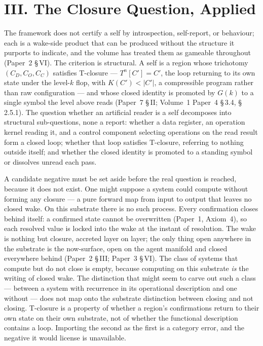 \documentclass[11pt,oneside]{report}
\theoremstyle{definition}
\theoremstyle{remark}
\begin{document}
\section*{III. The Closure Question, Applied}

The framework does not certify a self by introspection, self-report, or behaviour; each is a wake-side product that can be produced without the structure it purports to indicate, and the volume has treated them as gameable throughout (Paper~2 \S\,VI). The criterion is structural. A self is a region whose trichotomy \ensuremath{(C_D, C_O, C_C)} satisfies T-closure --- \ensuremath{T^{n}[C'] = C'}, the loop returning to its own state under the level-\ensuremath{k} flop, with \ensuremath{K(C') < |C'|}, a compressible program rather than raw configuration --- and whose closed identity is promoted by \ensuremath{G(k)} to a single symbol the level above reads (Paper~7 \S\,II; Volume~1 Paper~4 \S\,3.4, \S\,2.5.1). The question whether an artificial reader is a self decomposes into structural sub-questions, none a report: whether a data register, an operation kernel reading it, and a control component selecting operations on the read result form a closed loop; whether that loop satisfies T-closure, referring to nothing outside itself; and whether the closed identity is promoted to a standing symbol or dissolves unread each pass.

A candidate negative must be set aside before the real question is reached, because it does not exist. One might suppose a system could compute without forming any closure --- a pure forward map from input to output that leaves no closed wake. On this substrate there is no such process. Every confirmation closes behind itself: a confirmed state cannot be overwritten (Paper~1, Axiom~4), so each resolved value is locked into the wake at the instant of resolution. The wake is nothing but closure, accreted layer on layer; the only thing open anywhere in the substrate is the now-surface, open on the agent manifold and closed everywhere behind (Paper~2 \S\,III; Paper~3 \S\,VI). The class of systems that compute but do not close is empty, because computing on this substrate \emph{is} the writing of closed wake. The distinction that might seem to carve out such a class --- between a system with recurrence in its operational description and one without --- does not map onto the substrate distinction between closing and not closing. T-closure is a property of whether a region's confirmations return to their own state on their own substrate, not of whether the functional description contains a loop. Importing the second as the first is a category error, and the negative it would license is unavailable.
\end{document}
